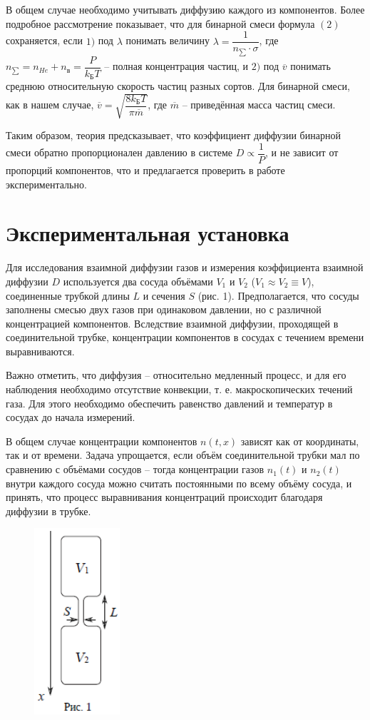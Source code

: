 \documentclass[a4paper,12pt]{article}
\begin{document}
В общем случае необходимо учитывать диффузию каждого из компонентов. Более подробное рассмотрение показывает, что для бинарной смеси формула $(2)$ сохраняется, если $1)$ под $\lambda$ понимать величину $\lambda = \dfrac{1}{n_{\sum} \cdot \sigma}$, где $n_{\sum} = n_{He} + n_{\text{в}} = \dfrac{P}{k_{\text{Б}} T}$ -- полная концентрация частиц, и $2)$ под $\overline{v}$ понимать среднюю относительную скорость частиц разных сортов. Для бинарной смеси, как в нашем случае, $\overline{v} = \sqrt{\dfrac{8 k_{\text{Б}} T}{\pi \overline{m}}}$, где $\overline{m}$ -- приведённая масса частиц смеси.

Таким образом, теория предсказывает, что коэффициент диффузии бинарной смеси обратно пропорционален давлению в системе $D \propto \dfrac{1}{P}$, и не зависит от пропорций компонентов, что и предлагается проверить в работе экспериментально.

\section{Экспериментальная установка}

Для исследования взаимной диффузии газов и измерения коэффициента взаимной диффузии $D$ используется два сосуда объёмами $V_1$ и $V_2$ ($V_1 \approx V_2 \equiv V$), соединенные трубкой длины $L$ и сечения $S$ (рис. 1). Предполагается, что сосуды заполнены смесью двух газов при одинаковом давлении, но с различной концентрацией компонентов. Вследствие взаимной диффузии, проходящей в соединительной трубке, концентрации компонентов в сосудах с течением времени выравниваются.

Важно отметить, что диффузия -- относительно медленный процесс, и для его наблюдения необходимо отсутствие конвекции, т. е. макроскопических течений газа. Для этого необходимо обеспечить равенство давлений и температур в сосудах до начала измерений.

В общем случае концентрации компонентов $n(t, x)$ зависят как от координаты, так и от времени. Задача упрощается, если объём соединительной трубки мал по сравнению с объёмами сосудов -- тогда концентрации газов $n_1(t)$ и $n_2(t)$ внутри каждого сосуда можно считать постоянными по всему объёму сосуда, и принять, что процесс выравнивания концентраций происходит благодаря диффузии в трубке.

\begin{figure}
    \includegraphics{2211.png}
\end{figure}
\end{document}
